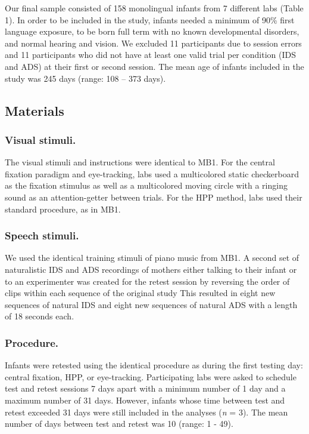 \documentclass[
  man,floatsintext]{apa6}
\begin{document}
Our final sample consisted of 158 monolingual infants from 7 different labs (Table 1).
In order to be included in the study, infants needed a minimum of 90\% first language exposure, to be born full term with no known developmental disorders, and normal hearing and vision.
We excluded 11 participants due to session errors and 11 participants who did not have at least one valid trial per condition (IDS and ADS) at their first or second session.
The mean age of infants included in the study was 245 days (range: 108 -- 373 days).

\hypertarget{materials}{%
\subsection{Materials}\label{materials}}

\hypertarget{visual-stimuli.}{%
\subsubsection{Visual stimuli.}\label{visual-stimuli.}}

The visual stimuli and instructions were identical to MB1.
For the central fixation paradigm and eye-tracking, labs used a multicolored static checkerboard as the fixation stimulus as well as a multicolored moving circle with a ringing sound as an attention-getter between trials.
For the HPP method, labs used their standard procedure, as in MB1.

\hypertarget{speech-stimuli.}{%
\subsubsection{Speech stimuli.}\label{speech-stimuli.}}

We used the identical training stimuli of piano music from MB1.
A second set of naturalistic IDS and ADS recordings of mothers either talking to their infant or to an experimenter was created for the retest session by reversing the order of clips within each sequence of the original study
This resulted in eight new sequences of natural IDS and eight new sequences of natural ADS with a length of 18 seconds each.

\hypertarget{procedure.}{%
\subsubsection{Procedure.}\label{procedure.}}

Infants were retested using the identical procedure as during the first testing day: central fixation, HPP, or eye-tracking.
Participating labs were asked to schedule test and retest sessions 7 days apart with a minimum number of 1 day and a maximum number of 31 days.
However, infants whose time between test and retest exceeded 31 days were still included in the analyses (\emph{n} = 3).
The mean number of days between test and retest was 10 (range: 1 - 49).
\end{document}
